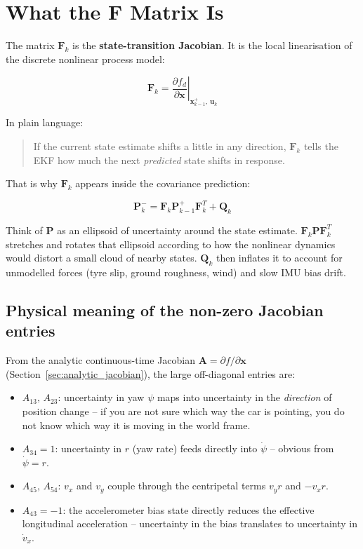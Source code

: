 \documentclass[11pt]{article}
\newcommand{\vect}[1]{\boldsymbol{#1}}
\newcommand{\mat}[1]{\mathbf{#1}}
\begin{document}
\section{What the F Matrix Is}

The matrix $\mat{F}_k$ is the \textbf{state-transition Jacobian}. It is the local linearisation of the discrete nonlinear process model:

\begin{equation}
\mat{F}_k = \left.\frac{\partial f_d}{\partial \vect{x}}\right|_{\vect{x}_{k-1}^+,\,\vect{u}_k}
\end{equation}

In plain language:

\begin{quote}
If the current state estimate shifts a little in any direction, $\mat{F}_k$ tells the EKF how much the next \emph{predicted} state shifts in response.
\end{quote}

That is why $\mat{F}_k$ appears inside the covariance prediction:

\begin{equation}
\mat{P}_k^- = \mat{F}_k \mat{P}_{k-1}^+ \mat{F}_k^T + \mat{Q}_k
\end{equation}

Think of $\mat{P}$ as an ellipsoid of uncertainty around the state estimate.
$\mat{F}_k \mat{P} \mat{F}_k^T$ stretches and rotates that ellipsoid according
to how the nonlinear dynamics would distort a small cloud of nearby states.
$\mat{Q}_k$ then inflates it to account for unmodelled forces (tyre slip,
ground roughness, wind) and slow IMU bias drift.

\subsection*{Physical meaning of the non-zero Jacobian entries}

From the analytic continuous-time Jacobian $\mat{A} = \partial f / \partial
\vect{x}$ (Section~\ref{sec:analytic_jacobian}), the large off-diagonal
entries are:

\begin{itemize}
    \item $A_{13},\,A_{23}$: uncertainty in yaw $\psi$ maps into uncertainty
          in the \emph{direction} of position change -- if you are not sure which
          way the car is pointing, you do not know which way it is moving in the
          world frame.
    \item $A_{34} = 1$: uncertainty in $r$ (yaw rate) feeds directly into
          $\dot\psi$ -- obvious from $\dot\psi = r$.
    \item $A_{45},\,A_{54}$: $v_x$ and $v_y$ couple through the centripetal
          terms $v_y r$ and $-v_x r$.
    \item $A_{43} = -1$: the accelerometer bias state directly reduces the
          effective longitudinal acceleration -- uncertainty in the bias
          translates to uncertainty in $\dot{v}_x$.
\end{itemize}
\end{document}
